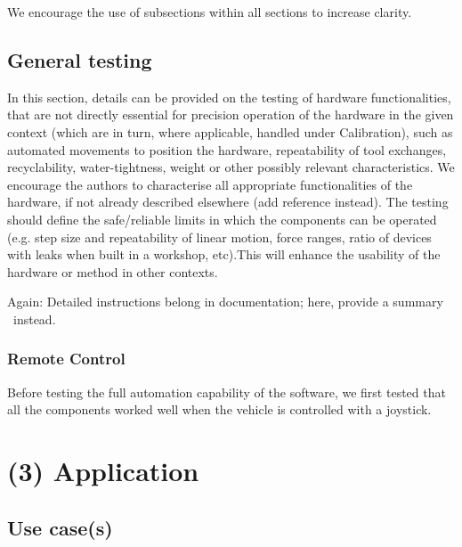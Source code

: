 \documentclass[a4paper]{article}
\begin{document}
We encourage the use of subsections within all sections to increase
clarity.


\subsection{General testing}\label{h.wbekh9ay82yu}

In this section, details can be provided on the testing of hardware
functionalities, that are not directly essential for precision
operation of the hardware in the given context (which are in turn,
where applicable, handled under Calibration), such as automated
movements to position the hardware, repeatability of tool exchanges,
recyclability, water-tightness, weight or other possibly relevant
characteristics. We encourage the authors to characterise all
appropriate functionalities of the hardware, if not already described
elsewhere (add reference instead). The testing should define the
safe/reliable limits in which the components can be operated (e.g. step
size and repeatability of linear motion, force ranges, ratio of devices
with leaks when built in a workshop, etc).This will enhance the
usability of the hardware or method in other contexts.

Again: Detailed instructions belong in documentation; here, provide a
summary ~instead.

\subsubsection{Remote Control}

Before testing the full automation capability of the software, we first tested that all the components worked well when the vehicle is controlled with a joystick.




\section{(3) Application}\label{h.f78bi3oom0mu}

\subsection{Use case(s)}\label{h.4q5g9edishy3}

\end{document}
